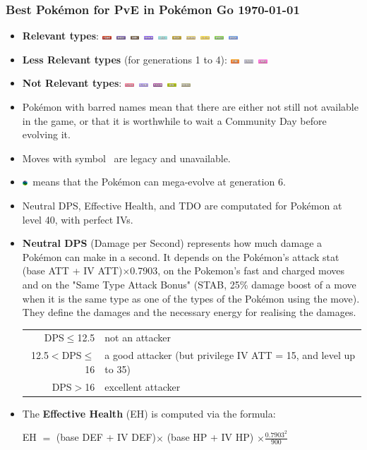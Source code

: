 \documentclass[8pt,aspectratio=169,compress]{beamer}
\newcommand{\fightingfull}{\includegraphics[height=0.15cm]{../../images/type/full/Fighting.png}}
\newcommand{\bugfull}{\includegraphics[height=0.15cm]{../../images/type/full/Bug.png}}
\newcommand{\darkfull}{\includegraphics[height=0.15cm]{../../images/type/full/Dark.png}}
\newcommand{\electricfull}{\includegraphics[height=0.15cm]{../../images/type/full/Electric.png}}
\newcommand{\fairyfull}{\includegraphics[height=0.15cm]{../../images/type/full/Fairy.png}}
\newcommand{\firefull}{\includegraphics[height=0.15cm]{../../images/type/full/Fire.png}}
\newcommand{\flyingfull}{\includegraphics[height=0.15cm]{../../images/type/full/Flying.png}}
\newcommand{\ghostfull}{\includegraphics[height=0.15cm]{../../images/type/full/Ghost.png}}
\newcommand{\dragonfull}{\includegraphics[height=0.15cm]{../../images/type/full/Dragon.png}}
\newcommand{\grassfull}{\includegraphics[height=0.15cm]{../../images/type/full/Grass.png}}
\newcommand{\groundfull}{\includegraphics[height=0.15cm]{../../images/type/full/Ground.png}}
\newcommand{\icefull}{\includegraphics[height=0.15cm]{../../images/type/full/Ice.png}}
\newcommand{\normalfull}{\includegraphics[height=0.15cm]{../../images/type/full/Normal.png}}
\newcommand{\psychicfull}{\includegraphics[height=0.15cm]{../../images/type/full/Psychic.png}}
\newcommand{\rockfull}{\includegraphics[height=0.15cm]{../../images/type/full/Rock.png}}
\newcommand{\waterfull}{\includegraphics[height=0.15cm]{../../images/type/full/Water.png}}
\newcommand{\poisonfull}{\includegraphics[height=0.15cm]{../../images/type/full/Poison.png}}
\newcommand{\steelfull}{\includegraphics[height=0.15cm]{../../images/type/full/Steel.png}}
\newcommand{\megaevol}{\includegraphics[width=0.2cm]{../../images/megaevolve}}
\begin{document}
\begin{frame}
\frametitle{Best Pok\'emon for PvE in Pok\'emon Go \hspace{8.5cm} \today}

\begin{block}{}
\begin{tiny}
\begin{itemize}
  \item \textbf{Relevant types}: \fightingfull ~\ghostfull ~\darkfull ~\dragonfull ~\icefull ~\rockfull ~\groundfull ~\electricfull ~\grassfull ~\waterfull 
 \item \textbf{Less Relevant types} (for generations 1 to 4): \firefull ~\steelfull ~\fairyfull 
 \item \textbf{Not Relevant types}:  \psychicfull ~\flyingfull ~\poisonfull ~\bugfull ~\normalfull
  \item Pok\'emon with barred names mean that there are either not still not available in the game, or that it is worthwhile to wait a Community Day before evolving it.
  \item Moves with symbol \dag~are legacy and unavailable.
  \item \megaevol~means that the Pok\'emon can mega-evolve at generation 6.
  \item Neutral DPS, Effective Health, and TDO are computated for Pok\'emon at level 40, with perfect IVs. 
  \item \textbf{Neutral DPS} (Damage per Second) represents how much damage a Pok\'emon can make in a second. It depends on the Pok\'emon's attack stat (base ATT + IV ATT)$\times$0.7903, on the Pokemon's fast and charged moves and on the "Same Type Attack Bonus" (STAB, 25\% damage boost of a move when it is the same type as one of the types of the Pokémon using the move). They define the damages and the necessary energy for realising the damages.
\begin{center}
\begin{tabular}{rl}
DPS$\leq$12.5   &  not an attacker  \\
12.5$<$DPS$\leq$16   &  a good attacker (but privilege IV ATT = 15, and level up to 35)  \\
DPS$>$16   &  excellent attacker  \\
\end{tabular}
\end{center}
  \item The \textbf{Effective Health} (EH) is computed via the formula:
\begin{center}
EH $=$ (base DEF + IV DEF)$\times$ (base HP + IV HP) $\times \frac{0.7903^2}{900}$

\end{center}
\end{itemize}
\end{tiny}
\end{block}
\end{frame}
\end{document}

